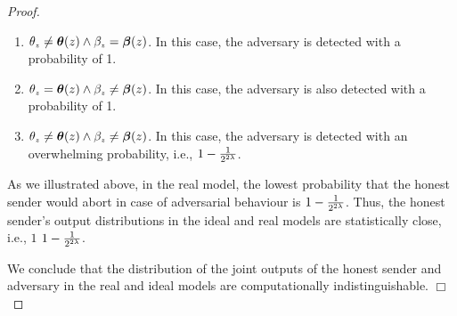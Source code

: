 \begin{proof}
\begin{enumerate}
%
\item $\theta_{\scriptscriptstyle z}\neq \bm\theta(z) \wedge  \beta_{\scriptscriptstyle  z}={\bm\beta}( z)$. In this case, the adversary is detected with a probability of 1. 
%
\item $\theta_{\scriptscriptstyle z}= \bm\theta(z) \wedge  \beta_{\scriptscriptstyle  z}\neq {\bm\beta}( z)$.  In this case, the adversary is also detected with a probability of 1.
%
\item $\theta_{\scriptscriptstyle z}\neq \bm\theta(z) \wedge  \beta_{\scriptscriptstyle  z} \neq {\bm\beta}( z)$. In this case, the adversary is detected with an overwhelming probability, i.e., $1-\frac{1}{2^{\scriptscriptstyle 2\lambda}}$. 
%
\end{enumerate}

As we illustrated above, in the real model, the lowest probability that the honest sender would abort in case of adversarial behaviour is $1-\frac{1}{2^{\scriptscriptstyle 2\lambda}}$. Thus, the honest sender's output distributions in the ideal and real models are statistically close, i.e., $1$  $1-\frac{1}{2^{\scriptscriptstyle 2\lambda}}$. 

We conclude that the distribution of the joint outputs of the honest sender and adversary in the real and ideal models are computationally indistinguishable. 
  \hfill\(\Box\)\end{proof}
  
  
  
  
  
  
  
  
  
  
  
  